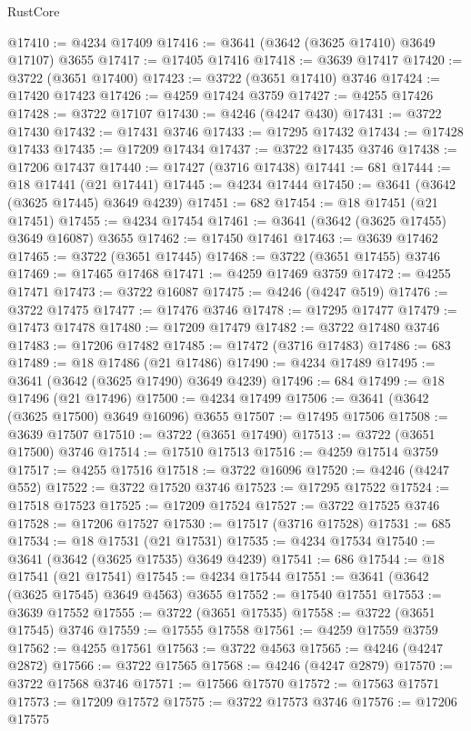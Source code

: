 \begin{lexlean}{RustCore}
\begin{coremodule}
@17410 := @4234 @17409
@17416 := @3641 (@3642 (@3625 @17410) @3649 @17107) @3655
@17417 := @17405 @17416
@17418 := @3639 @17417
@17420 := @3722 (@3651 @17400)
@17423 := @3722 (@3651 @17410) @3746
@17424 := @17420 @17423
@17426 := @4259 @17424 @3759
@17427 := @4255 @17426
@17428 := @3722 @17107
@17430 := @4246 (@4247 @430)
@17431 := @3722 @17430
@17432 := @17431 @3746
@17433 := @17295 @17432
@17434 := @17428 @17433
@17435 := @17209 @17434
@17437 := @3722 @17435 @3746
@17438 := @17206 @17437
@17440 := @17427 (@3716 @17438)
@17441 := 681
@17444 := @18 @17441 (@21 @17441)
@17445 := @4234 @17444
@17450 := @3641 (@3642 (@3625 @17445) @3649 @4239)
@17451 := 682
@17454 := @18 @17451 (@21 @17451)
@17455 := @4234 @17454
@17461 := @3641 (@3642 (@3625 @17455) @3649 @16087) @3655
@17462 := @17450 @17461
@17463 := @3639 @17462
@17465 := @3722 (@3651 @17445)
@17468 := @3722 (@3651 @17455) @3746
@17469 := @17465 @17468
@17471 := @4259 @17469 @3759
@17472 := @4255 @17471
@17473 := @3722 @16087
@17475 := @4246 (@4247 @519)
@17476 := @3722 @17475
@17477 := @17476 @3746
@17478 := @17295 @17477
@17479 := @17473 @17478
@17480 := @17209 @17479
@17482 := @3722 @17480 @3746
@17483 := @17206 @17482
@17485 := @17472 (@3716 @17483)
@17486 := 683
@17489 := @18 @17486 (@21 @17486)
@17490 := @4234 @17489
@17495 := @3641 (@3642 (@3625 @17490) @3649 @4239)
@17496 := 684
@17499 := @18 @17496 (@21 @17496)
@17500 := @4234 @17499
@17506 := @3641 (@3642 (@3625 @17500) @3649 @16096) @3655
@17507 := @17495 @17506
@17508 := @3639 @17507
@17510 := @3722 (@3651 @17490)
@17513 := @3722 (@3651 @17500) @3746
@17514 := @17510 @17513
@17516 := @4259 @17514 @3759
@17517 := @4255 @17516
@17518 := @3722 @16096
@17520 := @4246 (@4247 @552)
@17522 := @3722 @17520 @3746
@17523 := @17295 @17522
@17524 := @17518 @17523
@17525 := @17209 @17524
@17527 := @3722 @17525 @3746
@17528 := @17206 @17527
@17530 := @17517 (@3716 @17528)
@17531 := 685
@17534 := @18 @17531 (@21 @17531)
@17535 := @4234 @17534
@17540 := @3641 (@3642 (@3625 @17535) @3649 @4239)
@17541 := 686
@17544 := @18 @17541 (@21 @17541)
@17545 := @4234 @17544
@17551 := @3641 (@3642 (@3625 @17545) @3649 @4563) @3655
@17552 := @17540 @17551
@17553 := @3639 @17552
@17555 := @3722 (@3651 @17535)
@17558 := @3722 (@3651 @17545) @3746
@17559 := @17555 @17558
@17561 := @4259 @17559 @3759
@17562 := @4255 @17561
@17563 := @3722 @4563
@17565 := @4246 (@4247 @2872)
@17566 := @3722 @17565
@17568 := @4246 (@4247 @2879)
@17570 := @3722 @17568 @3746
@17571 := @17566 @17570
@17572 := @17563 @17571
@17573 := @17209 @17572
@17575 := @3722 @17573 @3746
@17576 := @17206 @17575

\end{coremodule}
\end{lexlean}
